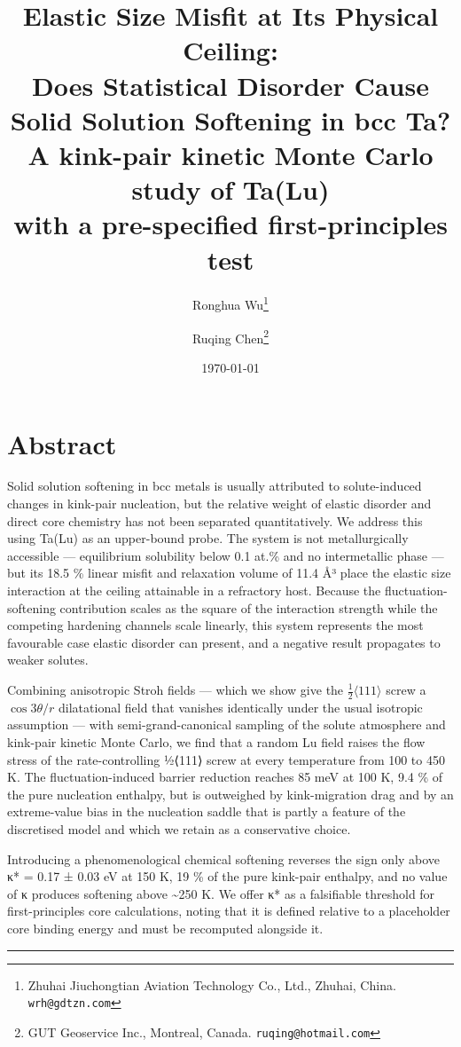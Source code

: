 \documentclass[11pt,a4paper]{article}
\title{\bfseries Elastic Size Misfit at Its Physical Ceiling:\\
Does Statistical Disorder Cause Solid Solution Softening in bcc Ta?\\[4pt]
\large A kink-pair kinetic Monte Carlo study of Ta(Lu)\\
with a pre-specified first-principles test}
\author{Ronghua Wu\thanks{Zhuhai Jiuchongtian Aviation Technology Co., Ltd.,
Zhuhai, China. \texttt{wrh@gdtzn.com}}
\and Ruqing Chen\thanks{GUT Geoservice Inc., Montreal, Canada.
\texttt{ruqing@hotmail.com}}}
\date{\today}
\begin{document}
\maketitle


\hypertarget{abstract}{%
\section*{Abstract}\label{sec:abstract}}

Solid solution softening in bcc metals is usually attributed to solute-induced changes in kink-pair nucleation, but the relative weight of elastic disorder and direct core chemistry has not been separated quantitatively. We address this using Ta(Lu) as an upper-bound probe. The system is not metallurgically accessible --- equilibrium solubility below 0.1 at.\% and no intermetallic phase --- but its 18.5 \% linear misfit and relaxation volume of 11.4 Å³ place the elastic size interaction at the ceiling attainable in a refractory host. Because the fluctuation-softening contribution scales as the square of the interaction strength while the competing hardening channels scale linearly, this system represents the most favourable case elastic disorder can present, and a negative result propagates to weaker solutes.

Combining anisotropic Stroh fields --- which we show give the \(\tfrac12\langle111\rangle\) screw a \(\cos 3\theta/r\) dilatational field that vanishes identically under the usual isotropic assumption --- with semi-grand-canonical sampling of the solute atmosphere and kink-pair kinetic Monte Carlo, we find that a random Lu field raises the flow stress of the rate-controlling ½⟨111⟩ screw at every temperature from 100 to 450 K. The fluctuation-induced barrier reduction reaches 85 meV at 100 K, 9.4 \% of the pure nucleation enthalpy, but is outweighed by kink-migration drag and by an extreme-value bias in the nucleation saddle that is partly a feature of the discretised model and which we retain as a conservative choice.

Introducing a phenomenological chemical softening reverses the sign only above κ* = 0.17 ± 0.03 eV at 150 K, 19 \% of the pure kink-pair enthalpy, and no value of κ produces softening above \textasciitilde250 K. We offer κ* as a falsifiable threshold for first-principles core calculations, noting that it is defined relative to a placeholder core binding energy and must be recomputed alongside it.

\begin{center}\rule{0.5\linewidth}{0.5pt}\end{center}
\end{document}
